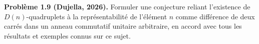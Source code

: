 \textbf{Problème 1.9 (Dujella, 2026).} Formuler une conjecture reliant l'existence de $D(n)$-quadruplets à la représentabilité de l'élément $n$ comme différence de deux carrés dans un anneau commutatif unitaire arbitraire, en accord avec tous les résultats et exemples connus sur ce sujet.
